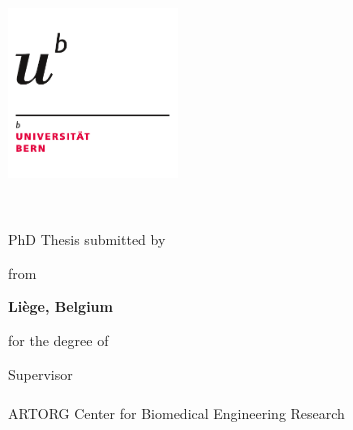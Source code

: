 
\begin{titlepage}
	
	\hfill{\includegraphics[width=4.5cm]{pics/Logo-unibe}}
	
	\begin{center}
		
		\vspace*{0.5cm}
		{\Large \facname \\ \textsc{\univname} \par}\vspace{1cm} %
		
		{\Large \bfseries \ttitle\par}\vspace{1cm} %
		
		\large{PhD Thesis submitted by}\vspace{0.5cm}
		
		{\Large \bfseries \authorname \par}\vspace{0.5cm}
		
		
		\large{from }{\Large \bfseries Liège, Belgium \par}\vspace{0.5cm}
		
		\large{for } the degree of \degreename \vspace{0.5cm}
		
		\vfill
		
		\large{Supervisor \\ \supname \\ ARTORG Center for Biomedical Engineering Research}\vspace{0.5cm}
		

\end{center}
\end{titlepage}
